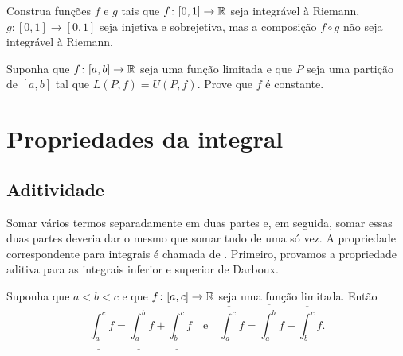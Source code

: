 \begin{exercise}[Desafiador]
Construa funções $f$ e $g$ tais que
$f \colon [0,1] \to {\mathbb{R}}$ seja integrável à Riemann,
$g \colon [0,1] \to [0,1]$ seja injetiva e sobrejetiva,
mas a composição $f \circ g$ não seja integrável à Riemann.
\end{exercise}

\begin{exercise}
Suponha que $f \colon [a,b] \to {\mathbb{R}}$ seja uma função limitada e que $P$ seja
uma partição de $[a,b]$ tal que $L(P,f)=U(P,f)$. Prove que $f$ é constante.
\end{exercise}



\sectionnewpage
\section{Propriedades da integral}
\label{sec:rintprop}



\subsection{Aditividade}

Somar vários termos separadamente em duas partes e, em seguida, somar essas
duas partes
deveria dar o mesmo que somar tudo de uma só vez.
A propriedade correspondente para integrais é chamada de
. Primeiro, provamos a propriedade
aditiva para as integrais inferior e superior de Darboux.

\begin{lemma} \label{lemma:darbouxadd}
Suponha que $a < b < c$ e que $f \colon [a,c] \to {\mathbb{R}}$ seja uma função limitada.
Então
\begin{equation*}
\underline{\int_a^c} f
=
\underline{\int_a^b} f
+
\underline{\int_b^c} f
\quad \text{e} \quad
\overline{\int_a^c} f
=
\overline{\int_a^b} f
+
\overline{\int_b^c} f .
\end{equation*}
\end{lemma}

